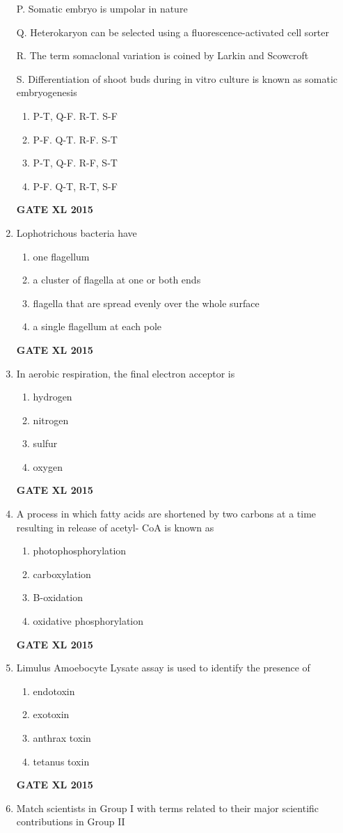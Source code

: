\documentclass[journal,12pt,onecolumn]{IEEEtran}
\begin{document}
\begin{enumerate}
P. Somatic embryo is umpolar in nature

Q. Heterokaryon can be selected using a fluorescence-activated cell sorter 

R. The term somaclonal variation is coined by Larkin and Scowcroft

S. Differentiation of shoot buds during in vitro culture is known as somatic embryogenesis
    \begin{enumerate}
            \item  P-T, Q-F. R-T. S-F
	    \item  P-F. Q-T. R-F. S-T
	    \item P-T, Q-F. R-F, S-T
            \item P-F. Q-T, R-T, S-F
    \end{enumerate}
\hfill{\textbf{GATE XL 2015}}
\item Lophotrichous bacteria have
    \begin{enumerate}
            \item one flagellum
	    \item a cluster of flagella at one or both ends
	    \item flagella that are spread evenly over the whole surface
            \item a single flagellum at each pole
    \end{enumerate}
\hfill{\textbf{GATE XL 2015}}
\item In aerobic respiration, the final electron acceptor is
    \begin{enumerate}
            \item hydrogen
	    \item nitrogen
	    \item sulfur
            \item oxygen
    \end{enumerate}
\hfill{\textbf{GATE XL 2015}}
\item A process in which fatty acids are shortened by two carbons at a time resulting in release of acetyl-
CoA is known as
    \begin{enumerate}
            \item photophosphorylation
	    \item carboxylation
	    \item B-oxidation
            \item oxidative phosphorylation
    \end{enumerate}
\hfill{\textbf{GATE XL 2015}}
\item  Limulus Amoebocyte Lysate  assay is used to identify the presence of
    \begin{enumerate}
            \item endotoxin
	    \item exotoxin
	    \item anthrax toxin
            \item tetanus toxin
    \end{enumerate}
\hfill{\textbf{GATE XL 2015}}
\item Match scientists in Group I with terms related to their major scientific contributions in Group II


\end{enumerate}
\end{document}
